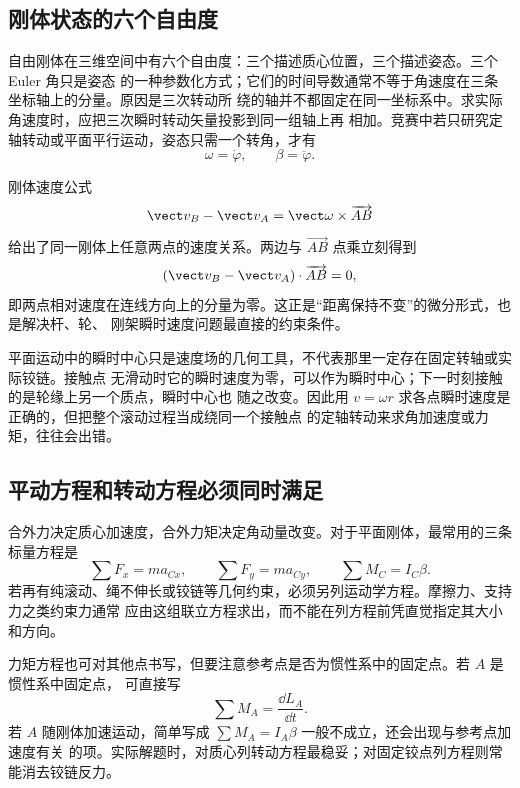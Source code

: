 \subsection*{刚体状态的六个自由度}

自由刚体在三维空间中有六个自由度：三个描述质心位置，三个描述姿态。三个 Euler 角只是姿态
的一种参数化方式；它们的时间导数通常不等于角速度在三条坐标轴上的分量。原因是三次转动所
绕的轴并不都固定在同一坐标系中。求实际角速度时，应把三次瞬时转动矢量投影到同一组轴上再
相加。竞赛中若只研究定轴转动或平面平行运动，姿态只需一个转角，才有
\begin{equation}
 \omega=\dot\varphi,
 \qquad
 \beta=\ddot\varphi.
\end{equation}

刚体速度公式
\begin{equation}
 \vect v_B-\vect v_A=\vect\omega\times\overrightarrow{AB}
\end{equation}
给出了同一刚体上任意两点的速度关系。两边与 $\overrightarrow{AB}$ 点乘立刻得到
\begin{equation}
 (\vect v_B-\vect v_A)\cdot\overrightarrow{AB}=0,
\end{equation}
即两点相对速度在连线方向上的分量为零。这正是“距离保持不变”的微分形式，也是解决杆、轮、
刚架瞬时速度问题最直接的约束条件。

平面运动中的瞬时中心只是速度场的几何工具，不代表那里一定存在固定转轴或实际铰链。接触点
无滑动时它的瞬时速度为零，可以作为瞬时中心；下一时刻接触的是轮缘上另一个质点，瞬时中心也
随之改变。因此用 $v=\omega r$ 求各点瞬时速度是正确的，但把整个滚动过程当成绕同一个接触点
的定轴转动来求角加速度或力矩，往往会出错。

\subsection*{平动方程和转动方程必须同时满足}

合外力决定质心加速度，合外力矩决定角动量改变。对于平面刚体，最常用的三条标量方程是
\begin{equation}
 \sum F_x=ma_{Cx},
 \qquad
 \sum F_y=ma_{Cy},
 \qquad
 \sum M_C=I_C\beta.
\end{equation}
若再有纯滚动、绳不伸长或铰链等几何约束，必须另列运动学方程。摩擦力、支持力之类约束力通常
应由这组联立方程求出，而不能在列方程前凭直觉指定其大小和方向。

力矩方程也可对其他点书写，但要注意参考点是否为惯性系中的固定点。若 $A$ 是惯性系中固定点，
可直接写
\begin{equation}
 \sum M_A=\frac{\dd L_A}{\dd t}.
\end{equation}
若 $A$ 随刚体加速运动，简单写成 $\sum M_A=I_A\beta$ 一般不成立，还会出现与参考点加速度有关
的项。实际解题时，对质心列转动方程最稳妥；对固定铰点列方程则常能消去铰链反力。

